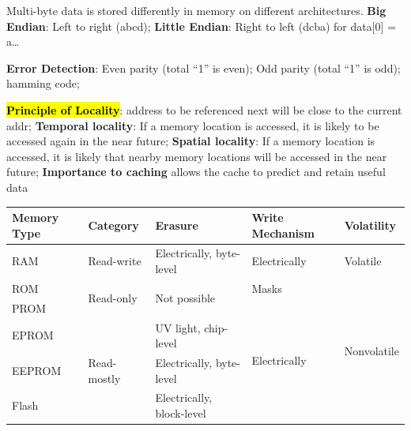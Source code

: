 \documentclass[a4paper]{article}
\begin{document}
\begin{multicols*}{2}
  Multi-byte data is stored differently in memory on different architectures. \textbf{Big Endian}: Left to right (abcd); \textbf{Little Endian}: Right to left (dcba) for data[0] = a…

  \textbf{Error Detection}: Even parity (total “1” is even); Odd parity (total “1” is odd); hamming code;

  \hl{\textbf{Principle of Locality}}: address to be referenced next will be close to the current addr; \textbf{Temporal locality}: If a memory location is accessed, it is likely to be accessed again in the near future; \textbf{Spatial locality}: If a memory location is accessed, it is likely that nearby memory locations will be accessed in the near future; \textbf{Importance to caching} allows the cache to predict and retain useful data

  \begin{tabular}{|l|l|l|l|l|}
    \hline
    \textbf{Memory Type} & \textbf{Category}            & \textbf{Erasure}              & \textbf{Write Mechanism}      & \textbf{Volatility}          \\ \hline
    RAM                  & Read-write                   & Electrically, byte-level      & Electrically                  & Volatile                     \\ \hline
    ROM                  & \multirow{2}{*}{Read-only}   & \multirow{2}{*}{Not possible} & Masks                         & \multirow{5}{*}{Nonvolatile} \\ \cline{1-1} \cline{4-4}
    PROM                 &                              &                               & \multirow{4}{*}{Electrically} &                              \\ \cline{1-3}
    EPROM                & \multirow{3}{*}{Read-mostly} & UV light, chip-level          &                               &                              \\ \cline{1-3}
    EEPROM               &                              & Electrically, byte-level      &                               &                              \\ \cline{1-3}
    Flash                &                              & Electrically, block-level     &                               &                              \\ \hline
  \end{tabular}


\end{multicols*}
\end{document}
